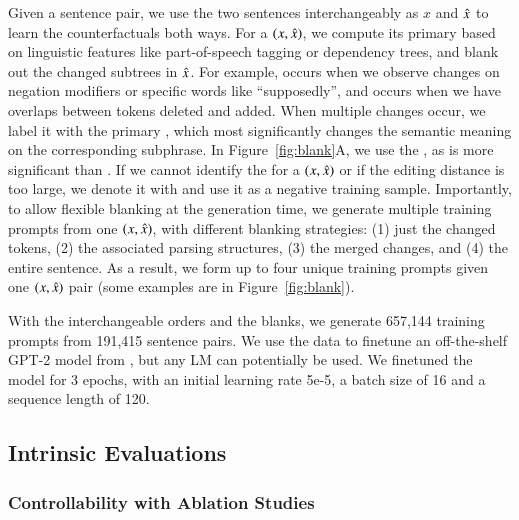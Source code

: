 Given a sentence pair, we use the two sentences interchangeably as $x$ and $\hat{x}$ to learn the counterfactuals both ways.
For a $(x, \hat{x})$, we compute its primary \tagstr based on linguistic features like part-of-speech tagging or dependency trees, and blank out the changed subtrees in $\hat{x}$.
For example,  occurs when we observe changes on negation modifiers or specific words like ``supposedly'', and  occurs when we have overlaps between tokens deleted and added.
When multiple changes occur, we label it with the primary \tagstr, which most significantly changes the semantic meaning on the corresponding subphrase.
In Figure~\ref{fig:blank}A, we use the \tagstrshort {}, as  is more significant than .
If we cannot identify the \tagstr for a $(x, \hat{x})$ or if the editing distance is too large, we denote it with  and use it as a negative training sample.
Importantly, to allow flexible blanking at the generation time, we generate multiple training prompts from one $(x, \hat{x})$, with different blanking strategies: (1) just the changed tokens, (2) the associated parsing structures, (3) the merged changes, and (4) the entire sentence.
As a result, we form up to four unique training prompts given one $(x, \hat{x})$ pair (some examples are in Figure~\ref{fig:blank}).


With the interchangeable orders and the blanks, we generate 657,144 training prompts from 191,415 sentence pairs.
We use the data to finetune an off-the-shelf GPT-2 model from \citet{Wolf2019HuggingFacesTS}, but any LM can potentially be used.
We finetuned the model for 3 epochs, with an initial learning rate 5e-5, a batch size of 16 and a sequence length of 120.


\subsection{Intrinsic Evaluations}
\label{appendix:intrinsic}






\subsubsection{Controllability with Ablation Studies}
\label{appendix:ablation_control}

